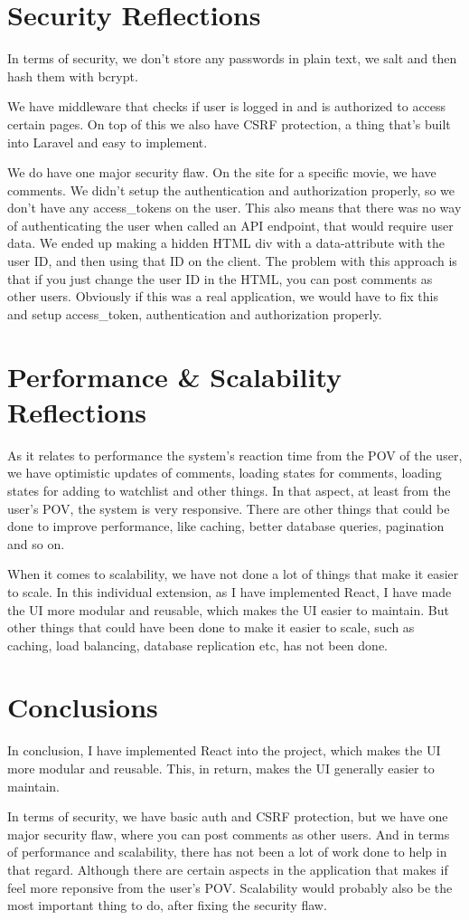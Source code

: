 \documentclass[letterpaper,twocolumn]{article}
\begin{document}
\section{Security Reflections}

In terms of security, we don't store any passwords in plain text, we salt and then hash them with bcrypt.

We have middleware that checks if user is logged in and is authorized to access certain pages.
On top of this we also have CSRF protection, a thing that's built into Laravel and easy to implement.

We do have one major security flaw. On the site for a specific movie, we have comments. We didn't setup the authentication and authorization properly, so we don't have any access\_tokens on the user.
This also means that there was no way of authenticating the user when called an API endpoint, that would require user data.
We ended up making a hidden HTML div with a data-attribute with the user ID, and then using that ID on the client.
The problem with this approach is that if you just change the user ID in the HTML, you can post comments as other users.
Obviously if this was a real application, we would have to fix this and setup access\_token, authentication and authorization properly.


\section{Performance \& Scalability Reflections}

As it relates to performance the system's reaction time from the POV of the user, we have optimistic updates of comments, loading states for comments, loading states for adding to watchlist and other things.
In that aspect, at least from the user's POV, the system is very responsive.
There are other things that could be done to improve performance, like caching, better database queries, pagination and so on.

When it comes to scalability, we have not done a lot of things that make it easier to scale.
In this individual extension, as I have implemented React, I have made the UI more modular and reusable, which makes the UI easier to maintain.
But other things that could have been done to make it easier to scale, such as caching, load balancing, database replication etc, has not been done.


\section{Conclusions}

In conclusion, I have implemented React into the project, which makes the UI more modular and reusable.
This, in return, makes the UI generally easier to maintain.

In terms of security, we have basic auth and CSRF protection, but we have one major security flaw, where you can post comments as other users.
And in terms of performance and scalability, there has not been a lot of work done to help in that regard.
Although there are certain aspects in the application that makes if feel more reponsive from the user's POV.
Scalability would probably also be the most important thing to do, after fixing the security flaw.
\end{document}

